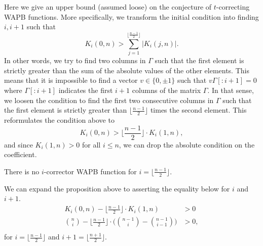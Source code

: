 Here we give an upper bound (assumed loose) on the conjecture of $t$-correcting WAPB functions. More specifically, we transform the initial condition into finding $i, i+1$ such that
$$
K_i(0, n) > \sum_{j = 1}^{\lfloor\frac{n-1}{2}\rfloor}|K_i(j, n)|.
$$
In other words, we try to find two columns in $\Gamma$ such that the first element is strictly greater than the sum of the absolute values of the other elements. This means that it is impossible to find a vector $v \in \{0,\pm1\}$ such that $v\Gamma[:i+1] = 0$ where $\Gamma[:i+1]$ indicates the first $i+1$ columns of the matrix $\Gamma$. In that sense, we loosen the condition to find the first two consecutive columns in $\Gamma$ such that the first element is strictly greater than $\lfloor \frac{n-1}{2} \rfloor$ times the second element. This reformulates the condition above to
$$
K_i(0, n) > \lfloor \frac{n-1}{2} \rfloor \cdot K_i(1, n),
$$
and since $K_i(1, n) > 0$ for all $i \leq n$, we can drop the absolute condition on the coefficient.

\begin{proposition}
There is no $i$-corrector WAPB function for $i = \big\lfloor \frac{n - 1}{2}\big\rfloor$.
\end{proposition}


We can expand the proposition above to asserting the equality below for $i$ and $i+1$.
\begin{equation*}
\begin{split}
K_i(0, n) - \bigg\lfloor\frac{n - 1}{2}\bigg\rfloor \cdot K_i(1, n) &> 0\\
\binom{n}{i} - \bigg\lfloor\frac{n - 1}{2}\bigg\rfloor\cdot\Bigg(\binom{n - 1}{i} - \binom{n - 1}{i - 1}\Bigg) &> 0,\\
\end{split}
\end{equation*}
for $i = \big\lfloor \frac{n - 1}{2}\big\rfloor$ and $i +1 = \big\lfloor \frac{n + 1}{2}\big\rfloor$.

